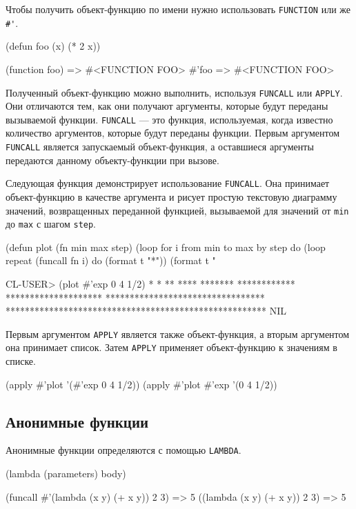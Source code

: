 Чтобы получить объект-функцию по имени нужно использовать \lstinline{FUNCTION} или же \lstinline{#'}.
\begin{cllst}{}{}
(defun foo (x) (* 2 x))

(function foo) => #<FUNCTION FOO>
#'foo          => #<FUNCTION FOO>
\end{cllst}

Полученный объект-функцию можно выполнить, используя \lstinline{FUNCALL} или \lstinline{APPLY}. Они отличаются тем, как они получают аргументы, которые будут переданы вызываемой функции. \lstinline{FUNCALL} — это функция, используемая, когда известно количество аргументов, которые будут переданы функции. Первым аргументом \lstinline{FUNCALL} является запускаемый объект-функция, а оставшиеся аргументы передаются данному объекту-функции при вызове.

Следующая функция демонстрирует использование \lstinline{FUNCALL}. Она принимает объект-функцию в качестве аргумента и рисует простую текстовую диаграмму значений, возвращенных переданной функцией, вызываемой для значений от \lstinline{min} до \lstinline{max} с шагом \lstinline{step}.
\begin{cllst}{}{}
(defun plot (fn min max step)
  (loop for i from min to max by step do
        (loop repeat (funcall fn i) do (format t "*"))
        (format t "~%

CL-USER> (plot #'exp 0 4 1/2)
*
*
**
****
*******
************
********************
*********************************
******************************************************
NIL
\end{cllst}

Первым аргументом \lstinline{APPLY} является также объект-функция, а вторым аргументом она принимает список. Затем \lstinline{APPLY} применяет объект-функцию к значениям в списке.
\begin{cllst}{}{}
(apply #'plot '(#'exp 0 4 1/2))
(apply #'plot #'exp '(0 4 1/2))
\end{cllst}

\subsection{Анонимные функции}
Анонимные функции определяются с помощью \lstinline{LAMBDA}.
\begin{cllst}{}{}
(lambda (parameters) body)

(funcall #'(lambda (x y) (+ x y)) 2 3) => 5
((lambda (x y) (+ x y)) 2 3)           => 5
\end{cllst}

